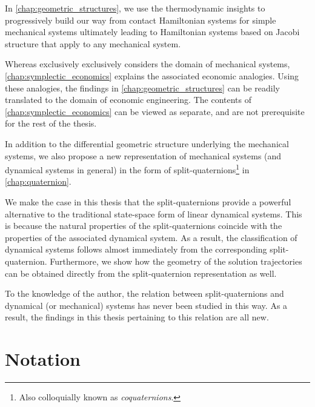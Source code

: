 In \cref{chap:geometric_structures}, we use the thermodynamic insights to progressively build our way from contact Hamiltonian systems for simple mechanical systems ultimately leading to Hamiltonian systems based on Jacobi structure that apply to any mechanical system.
%

Whereas  exclusively exclusively considers the domain of mechanical systems, \cref{chap:symplectic_economics} explains the associated economic analogies. Using these analogies, the findings in \cref{chap:geometric_structures} can be readily translated to the domain of economic engineering. 
The contents of \cref{chap:symplectic_economics} can be viewed as separate, and are not prerequisite for the rest of the thesis.

In addition to the differential geometric structure underlying the mechanical systems, we also propose a new representation of mechanical systems (and dynamical systems in general) in the form of split-quaternions\footnote{Also colloquially known as \emph{coquaternions}.} in \cref{chap:quaternion}. 

We make the case in this thesis that the split-quaternions provide a powerful alternative to the traditional state-space form of linear dynamical systems. This is because the natural properties of the split-quaternions coincide with the properties of the associated dynamical system. As a result, the classification of dynamical systems follows almost immediately from the corresponding split-quaternion. Furthermore, we show how the geometry of the solution trajectories can be obtained directly from the split-quaternion representation as well.

To the knowledge of the author, the relation between split-quaternions and dynamical (or mechanical) systems has never been studied in this way. As a result, the findings in this thesis pertaining to this relation are all new.

\section*{Notation}
